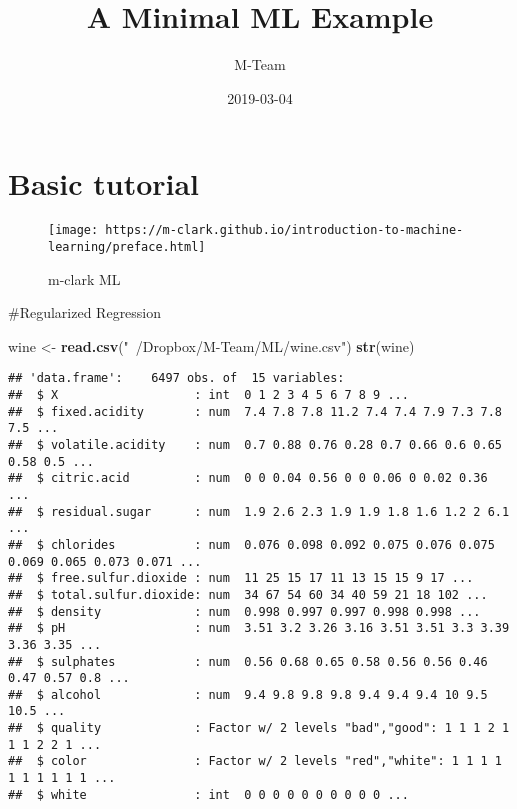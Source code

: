 \documentclass[]{book}
\title{A Minimal ML Example}
\author{M-Team}
\date{2019-03-04}
\newenvironment{Shaded}{\begin{snugshade}}{\end{snugshade}}
\newcommand{\KeywordTok}[1]{\textcolor[rgb]{0.13,0.29,0.53}{\textbf{#1}}}
\newcommand{\StringTok}[1]{\textcolor[rgb]{0.31,0.60,0.02}{#1}}
\newcommand{\NormalTok}[1]{#1}
\begin{document}
\maketitle

{
\setcounter{tocdepth}{1}
\tableofcontents
}
\hypertarget{basic-tutorial}{%
\chapter{Basic tutorial}\label{basic-tutorial}}

\begin{figure}
\centering
\texttt{[image: https://m-clark.github.io/introduction-to-machine-learning/preface.html]}
\caption{m-clark ML}
\end{figure}

\#Regularized Regression

\begin{Shaded}
\begin{Highlighting}[]
\NormalTok{wine <-}\StringTok{ }\KeywordTok{read.csv}\NormalTok{(}\StringTok{"~/Dropbox/M-Team/ML/wine.csv"}\NormalTok{)}
\KeywordTok{str}\NormalTok{(wine)}
\end{Highlighting}
\end{Shaded}

\begin{verbatim}
## 'data.frame':    6497 obs. of  15 variables:
##  $ X                   : int  0 1 2 3 4 5 6 7 8 9 ...
##  $ fixed.acidity       : num  7.4 7.8 7.8 11.2 7.4 7.4 7.9 7.3 7.8 7.5 ...
##  $ volatile.acidity    : num  0.7 0.88 0.76 0.28 0.7 0.66 0.6 0.65 0.58 0.5 ...
##  $ citric.acid         : num  0 0 0.04 0.56 0 0 0.06 0 0.02 0.36 ...
##  $ residual.sugar      : num  1.9 2.6 2.3 1.9 1.9 1.8 1.6 1.2 2 6.1 ...
##  $ chlorides           : num  0.076 0.098 0.092 0.075 0.076 0.075 0.069 0.065 0.073 0.071 ...
##  $ free.sulfur.dioxide : num  11 25 15 17 11 13 15 15 9 17 ...
##  $ total.sulfur.dioxide: num  34 67 54 60 34 40 59 21 18 102 ...
##  $ density             : num  0.998 0.997 0.997 0.998 0.998 ...
##  $ pH                  : num  3.51 3.2 3.26 3.16 3.51 3.51 3.3 3.39 3.36 3.35 ...
##  $ sulphates           : num  0.56 0.68 0.65 0.58 0.56 0.56 0.46 0.47 0.57 0.8 ...
##  $ alcohol             : num  9.4 9.8 9.8 9.8 9.4 9.4 9.4 10 9.5 10.5 ...
##  $ quality             : Factor w/ 2 levels "bad","good": 1 1 1 2 1 1 1 2 2 1 ...
##  $ color               : Factor w/ 2 levels "red","white": 1 1 1 1 1 1 1 1 1 1 ...
##  $ white               : int  0 0 0 0 0 0 0 0 0 0 ...
\end{verbatim}
\end{document}
